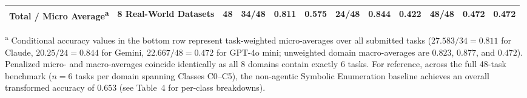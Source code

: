 \begin{table}[!b]
{\begin{tabular}{llc ccc ccc ccc}
\midrule
\textbf{Total / Micro Average}\textsuperscript{a} & \textbf{8 Real-World Datasets} & \textbf{48} & \textbf{34/48} & \textbf{0.811} & \textbf{0.575} & \textbf{24/48} & \textbf{0.844} & \textbf{0.422} & \textbf{48/48} & \textbf{0.472} & \textbf{0.472} \\
\bottomrule
\end{tabular}%
}
\par\vspace{2pt}
{\footnotesize \textsuperscript{a} Conditional accuracy values in the bottom row represent task-weighted micro-averages over all submitted tasks ($27.583/34 = 0.811$ for Claude, $20.25/24 = 0.844$ for Gemini, $22.667/48 = 0.472$ for GPT-4o mini; unweighted domain macro-averages are $0.823$, $0.877$, and $0.472$). Penalized micro- and macro-averages coincide identically as all 8 domains contain exactly 6 tasks. For reference, across the full 48-task benchmark ($n=6$ tasks per domain spanning Classes C0--C5), the non-agentic Symbolic Enumeration baseline achieves an overall transformed accuracy of $0.653$ (see Table~4 for per-class breakdowns).}
\end{table}
